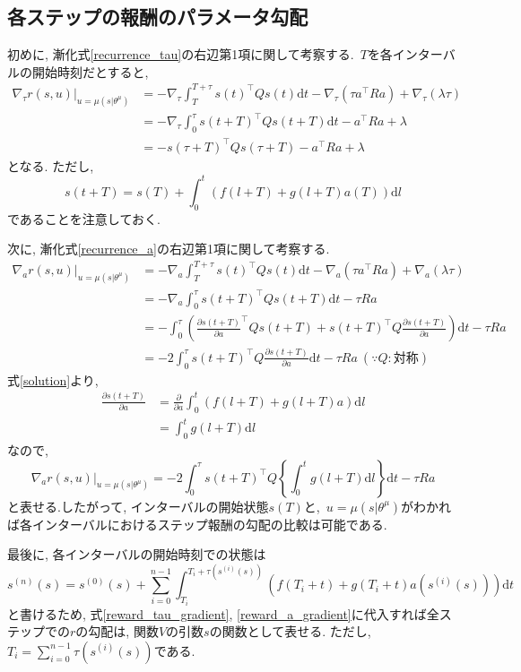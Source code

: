 \documentclass{jsarticle}
\newcommand{\pdif}[2]{\frac{\partial#1}{\partial#2}}
\begin{document}
\subsection{各ステップの報酬のパラメータ勾配}
初めに, 漸化式\eqref{recurrence_tau}の右辺第1項に関して考察する.~$T$を各インターバルの開始時刻だとすると, 
\begin{align}
	\nabla_{\tau}r(s, u)|_{u=\mu(s|\theta^{\mu})} &= -\nabla_{\tau}\int_{T}^{T+\tau} s(t)^{\top}Qs(t)\textrm{d}t - \nabla_{\tau}(\tau a^{\top}Ra) + \nabla_{\tau}(\lambda\tau) \nonumber\\
	&= -\nabla_{\tau}\int_{0}^{\tau} s(t+T)^{\top}Qs(t+T)\textrm{d}t - a^{\top}Ra + \lambda \nonumber\\
	&= - s(\tau+T)^{\top}Qs(\tau+T) - a^{\top}Ra + \lambda \label{reward_tau_gradient}
\end{align}
となる. ただし, 
\begin{equation}
	s(t+T) = s(T) + \int_{0}^{t} (f(l+T)+g(l+T)a(T))\textrm{d}l \label{solution}
\end{equation}
であることを注意しておく.
\par
次に, 漸化式\eqref{recurrence_a}の右辺第1項に関して考察する. 
\begin{align}
	\nabla_{a}r(s, u)|_{u=\mu(s|\theta^{\mu})} &= -\nabla_{a}\int_{T}^{T+\tau} s(t)^{\top}Qs(t)\textrm{d}t - \nabla_{a}(\tau a^{\top}Ra) + \nabla_{a}(\lambda\tau) \nonumber\\
	&= -\nabla_{a}\int_{0}^{\tau} s(t+T)^{\top}Qs(t+T)\textrm{d}t - \tau Ra \nonumber\\
	&= -\int_{0}^{\tau} (\pdif{s(t+T)}{a}^{\top}Qs(t+T)+s(t+T)^{\top}Q\pdif{s(t+T)}{a})\textrm{d}t - \tau Ra \nonumber \\
	&= -2\int_{0}^{\tau} s(t+T)^{\top}Q\pdif{s(t+T)}{a}\textrm{d}t - \tau Ra~(∵Q:対称)
\end{align}
式\eqref{solution}より, 
\begin{align}
	\pdif{s(t+T)}{a} &= \pdif{}{a}\int_{0}^{t} (f(l+T)+g(l+T)a)\textrm{d}l \nonumber \\
	&= \int_{0}^{t} g(l+T)\textrm{d}l
\end{align}
なので, 
\begin{equation}
	\nabla_{a}r(s, u)|_{u=\mu(s|\theta^{\mu})} = -2\int_{0}^{\tau}s(t+T)^{\top}Q\left\{\int_{0}^{t}g(l+T)\textrm{d}l\right\}\textrm{d}t - \tau Ra \label{reward_a_gradient}
\end{equation}
と表せる.したがって, インターバルの開始状態$s(T)$と,~$u=\mu(s|\theta^{\mu})$がわかれば各インターバルにおけるステップ報酬の勾配の比較は可能である.\par
最後に, 各インターバルの開始時刻での状態は
\begin{equation}
	s^{(n)}(s) = s^{(0)}(s) + \sum_{i=0}^{n−1}\int_{T_i}^{T_i + \tau(s^{(i)}(s))}(f(T_i+t)+g(T_i+t)a(s^{(i)}(s)))\textrm{d}t
\end{equation}
と書けるため, 式\eqref{reward_tau_gradient}, \eqref{reward_a_gradient}に代入すれば全ステップでの$r$の勾配は, 関数$V$の引数$s$の関数として表せる. ただし,~$T_i = \sum_{i=0}^{n-1}\tau(s^{(i)}(s))$である. 
\end{document}
